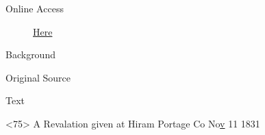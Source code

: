 {			\begin{description}
				\item[Online Access] \href{https://www.josephsmithpapers.org/paper-summary/revelation-11-november-1831-b-dc-107-partial/1}{Here}
			\end{description}
			
			\begin{description}
				\item[Background]
			\end{description}
			
			
			\begin{description}
				\item[Original Source]
			\end{description}
			
			
			\begin{description}
				\item[Text]
			\end{description}
			
				\begin{tightcenter}
				<75> A Revalation given at Hiram Portage Co No\uline{v} 11 1831
				\end{tightcenter}
				
}
